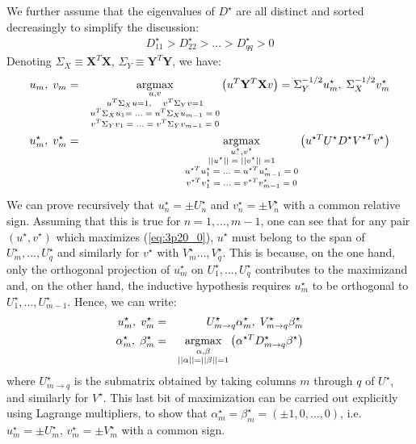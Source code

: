 We further assume that the eigenvalues of $D ^{\star}$ are all distinct and sorted decreasingly to simplify the discussion:
\begin{eqnarray*}
D ^{\star}_{11} > D  ^{\star}_{22} > \ldots > D ^{\star}_{qq} > 0
\end{eqnarray*}
 Denoting
$\Sigma_X \equiv \mathbf{X}^T \mathbf{X}$, $\Sigma_Y \equiv \mathbf{Y}^T \mathbf{Y}$, we have:
\begin{eqnarray}\nonumber
u_m, \;v_m & = & \operatorname*{argmax}_{\substack{u, v \\ u^T \Sigma_X u = 1, \quad v^T \Sigma_Y v = 1 \\ u^T \Sigma_X u_1 =\; \ldots\; = \; u^T \Sigma_X u_{m- 1} \;=\;0 \\ v^T \Sigma_Y v_1\;=\;\ldots\; = \;v^T \Sigma_Y v_{m- 1}\;=\;0}} \left( u^T \mathbf{Y}^T \mathbf{X} v \right) = \Sigma_Y^{-1/2} u_m ^{\star}, \;\Sigma_X^{-1/2} v_m ^{\star} \\
u_m ^{\star}, \; v_m ^{\star} & = & \operatorname*{argmax}_{\substack{u ^{\star}, v ^{\star} \\ || u ^{\star}||\;=\;|| v ^{\star} ||\;= 1 \\ u ^{\star T} u ^{\star}_1\;=\; \ldots\; = \;u ^{\star T} u ^{\star}_{m - 1}\;=\;0 \\ v ^{\star T} v ^{\star}_1\;=\; \ldots\; = \;v ^{\star T} v ^{\star}_{m - 1}\;=\;0}} \left( u ^{\star T} U ^{\star} D ^{\star} V^{\star T} v ^{\star} \right) \label{eq:3p20_0}
\end{eqnarray}
We can prove recursively that $u ^{\star}_n = \pm U ^{\star}_n$ and $v ^{\star}_n = \pm V ^{\star}_n$ with a common relative sign. Assuming that this is true for $n = 1, \ldots, m - 1$, one can see that for any pair $(u ^{\star}, v ^{\star})$ which maximizes (\ref{eq:3p20_0}), $u ^{\star}$ must belong to the span of $U ^{\star}_{m}, \ldots, U ^{\star}_{q}$ and similarly for $v ^{\star}$ with $V ^{\star}_m \ldots, V ^{\star}_q$. This is because, on the one hand, only the orthogonal projection of $u ^{\star}_m$ on $U ^{\star}_1, \ldots, U ^{\star}_q$ contributes to the maximizand and, on the other hand, the inductive hypothesis requires $u ^{\star}_m$ to be orthogonal to $U ^{\star}_1, \ldots, U ^{\star}_{m - 1}$. Hence, we can write:
\begin{eqnarray*}
u_m ^{\star}, \; v_m ^{\star} & = & U ^{\star}_{m\rightarrow q} \alpha_m ^{\star}, \; V ^{\star}_{m\rightarrow q} \beta_m ^{\star} \\
\alpha_m ^{\star}, \; \beta_m ^{\star} & = & \operatorname*{argmax}_{\substack{\alpha, \beta \\ ||\alpha|| = ||\beta|| = 1}} \left( \alpha ^{\star T} D ^{\star}_{m\rightarrow q} \beta ^{\star} \right)
\end{eqnarray*}
where $U ^{\star}_{m \rightarrow q}$ is the submatrix obtained by taking columns $m$ through $q$ of $U ^{\star}$, and similarly for $V ^{\star}$. This last bit of maximization can be carried out explicitly using Lagrange multipliers, to show that $\alpha ^{\star}_m = \beta ^{\star}_m = \left( \pm 1, 0, \ldots, 0 \right)$, i.e. $u ^{\star}_m = \pm U ^{\star}_m$, $v ^{\star}_m = \pm V ^{\star}_m$ with a common sign.


